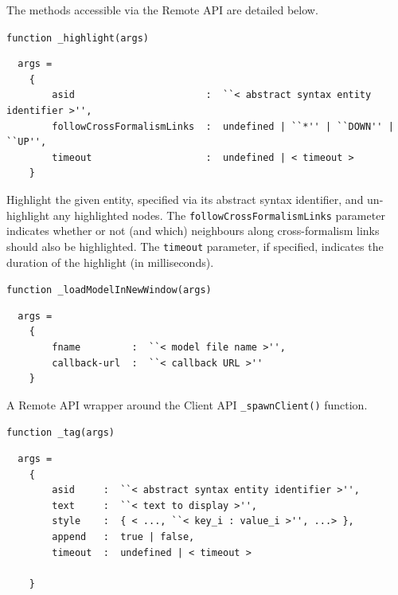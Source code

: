 \documentclass{article}
\numberwithin{equation}{section}
\numberwithin{figure}{section}
\begin{document}
The methods accessible via the Remote API are detailed below.\\

\begin{center}	{\large \texttt{function \_highlight(args)}} \end{center}
\begin{verbatim}
  args = 
    {
        asid                       :  ``< abstract syntax entity identifier >'',
        followCrossFormalismLinks  :  undefined | ``*'' | ``DOWN'' | ``UP'',
        timeout                    :  undefined | < timeout >
    }
\end{verbatim}

Highlight the given entity, specified via its abstract syntax identifier, and un-highlight any highlighted nodes. The \texttt{followCrossFormalismLinks} parameter indicates whether or not (and which) neighbours along cross-formalism links should also be highlighted. The \texttt{timeout} parameter, if specified, indicates the duration of the highlight (in milliseconds).\\
\vspace*{1em}


\begin{center}	{\large \texttt{function \_loadModelInNewWindow(args)}} \end{center}
\begin{verbatim}
  args = 
    {
        fname         :  ``< model file name >'',
        callback-url  :  ``< callback URL >''
    }
\end{verbatim}

A Remote API wrapper around the Client API \texttt{\_spawnClient()} function.\\
\vspace*{1em}


\begin{center}	{\large \texttt{function \_tag(args)}} \end{center}
\begin{verbatim}
  args = 
    {
        asid     :  ``< abstract syntax entity identifier >'',
        text     :  ``< text to display >'',
        style    :  { < ..., ``< key_i : value_i >'', ...> },
        append   :  true | false,                
        timeout  :  undefined | < timeout >
        
    }
\end{verbatim}
\end{document}
